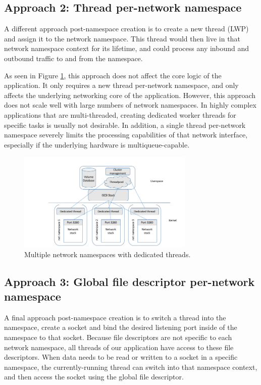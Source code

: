 \documentclass[letterpaper]{article}
\begin{document}
\subsection{Approach 2: Thread per-network namespace}
A different approach post-namespace creation is to create a new thread (LWP) and assign it to the network namespace. This thread would then live in that network namespace context for its lifetime, and could process any inbound and outbound traffic to and from the namespace.

As seen in Figure \ref{namespace-threads}, this approach does not affect the core logic of the application. It only requires a new thread per-network namespace, and only affects the underlying networking core of the application. However, this approach does not scale well with large numbers of network namespaces. In highly complex applications that are multi-threaded, creating dedicated worker threads for specific tasks is usually not desirable. In addition, a single thread per-network namespace severely limits the processing capabilities of that network interface, especially if the underlying hardware is multiqueue-capable.

\begin{figure}[h]
\includegraphics[width=3.31in]{multiple-stacks-namespaces-dedicated-threads.png}
\caption{Multiple network namespaces with dedicated threads.}
\label{namespace-threads}
\end{figure}

\subsection{Approach 3: Global file descriptor per-network namespace}
A final approach post-namespace creation is to switch a thread into the namespace, create a socket and bind the desired listening port inside of the namespace to that socket. Because file descriptors are not specific to each network namespace, all threads of our application have access to these file descriptors. When data needs to be read or written to a socket in a specific namespace, the currently-running thread can switch into that namespace context, and then access the socket using the global file descriptor.
\end{document}
